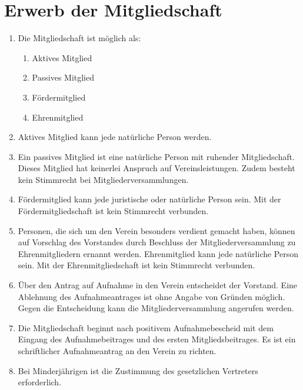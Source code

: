 \documentclass[a4paper,ngerman]{scrartcl}
\begin{document}
\section{Erwerb der Mitgliedschaft}
\begin{enumerate}
\item Die Mitgliedschaft ist möglich als: 
\begin{enumerate}
\item Aktives Mitglied
\item Passives Mitglied
\item Fördermitglied
\item Ehrenmitglied
\end{enumerate}
\item Aktives Mitglied kann jede natürliche Person werden. 
\item Ein passives Mitglied ist eine natürliche Person mit ruhender Mitgliedschaft. Dieses Mitglied hat keinerlei Anspruch auf Vereinsleistungen. Zudem besteht kein Stimmrecht bei Mitgliederversammlungen.
\item Fördermitglied kann jede juristische oder natürliche Person sein. Mit der Fördermitgliedschaft ist kein Stimmrecht verbunden.
\item 
Personen, die sich um den Verein besonders verdient gemacht haben, können auf Vorschlag des Vorstandes durch Beschluss der Mitgliederversammlung zu Ehrenmitgliedern ernannt werden.
Ehrenmitglied kann jede natürliche Person sein. Mit der Ehrenmitgliedschaft ist kein Stimmrecht verbunden.
\item Über den Antrag auf Aufnahme in den Verein entscheidet der Vorstand. Eine Ablehnung des Aufnahmeantrages ist ohne Angabe von Gründen möglich. Gegen die Entscheidung kann die Mitgliederversammlung angerufen werden.
\item Die Mitgliedschaft beginnt nach positivem Aufnahmebescheid mit dem Eingang des Aufnahmebeitrages und des ersten Mitgliedsbeitrages. Es ist ein schriftlicher Aufnahmeantrag an den Verein zu richten.
\item Bei Minderjährigen ist die Zustimmung des gesetzlichen Vertreters erforderlich.
\end{enumerate}
\end{document}
